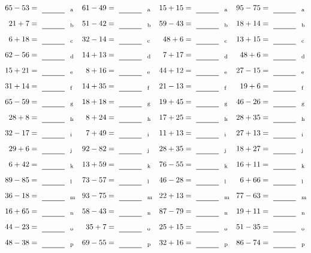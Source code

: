 \documentclass
[
  draft    = true,
  fontsize = 11pt,
  parskip  = half-
]
{scrartcl}
\begin{document}
\clearpage
\begin{align*}
    \pline{65-53}&=\rline{a}
  & \pline{61-49}&=\rline{a}
  & \pline{15+15}&=\rline{a}
  & \pline{95-75}&=\rline{a} \\[1ex]
    \pline{21+7}&=\rline{b}
  & \pline{51-42}&=\rline{b}
  & \pline{59-43}&=\rline{b}
  & \pline{18+14}&=\rline{b} \\[1ex]
    \pline{6+18}&=\rline{c}
  & \pline{32-14}&=\rline{c}
  & \pline{48+6}&=\rline{c}
  & \pline{13+15}&=\rline{c} \\[1ex]
    \pline{62-56}&=\rline{d}
  & \pline{14+13}&=\rline{d}
  & \pline{7+17}&=\rline{d}
  & \pline{48+6}&=\rline{d} \\[1ex]
    \pline{15+21}&=\rline{e}
  & \pline{8+16}&=\rline{e}
  & \pline{44+12}&=\rline{e}
  & \pline{27-15}&=\rline{e} \\[1ex]
    \pline{31+14}&=\rline{f}
  & \pline{14+35}&=\rline{f}
  & \pline{21-13}&=\rline{f}
  & \pline{19+6}&=\rline{f} \\[1ex]
    \pline{65-59}&=\rline{g}
  & \pline{18+18}&=\rline{g}
  & \pline{19+45}&=\rline{g}
  & \pline{46-26}&=\rline{g} \\[1ex]
    \pline{28+8}&=\rline{h}
  & \pline{8+24}&=\rline{h}
  & \pline{17+25}&=\rline{h}
  & \pline{28+35}&=\rline{h} \\[1ex]
    \pline{32-17}&=\rline{i}
  & \pline{7+49}&=\rline{i}
  & \pline{11+13}&=\rline{i}
  & \pline{27+13}&=\rline{i} \\[1ex]
    \pline{29+6}&=\rline{j}
  & \pline{92-82}&=\rline{j}
  & \pline{28+35}&=\rline{j}
  & \pline{18+27}&=\rline{j} \\[1ex]
    \pline{6+42}&=\rline{k}
  & \pline{13+59}&=\rline{k}
  & \pline{76-55}&=\rline{k}
  & \pline{16+11}&=\rline{k} \\[1ex]
    \pline{89-85}&=\rline{l}
  & \pline{73-57}&=\rline{l}
  & \pline{46-28}&=\rline{l}
  & \pline{6+66}&=\rline{l} \\[1ex]
    \pline{36-18}&=\rline{m}
  & \pline{93-75}&=\rline{m}
  & \pline{22+13}&=\rline{m}
  & \pline{77-63}&=\rline{m} \\[1ex]
    \pline{16+65}&=\rline{n}
  & \pline{58-43}&=\rline{n}
  & \pline{87-79}&=\rline{n}
  & \pline{19+11}&=\rline{n} \\[1ex]
    \pline{44-23}&=\rline{o}
  & \pline{35+7}&=\rline{o}
  & \pline{25+15}&=\rline{o}
  & \pline{51-35}&=\rline{o} \\[1ex]
    \pline{48-38}&=\rline{p}
  & \pline{69-55}&=\rline{p}
  & \pline{32+16}&=\rline{p}
  & \pline{86-74}&=\rline{p}
\end{align*}
\end{document}
